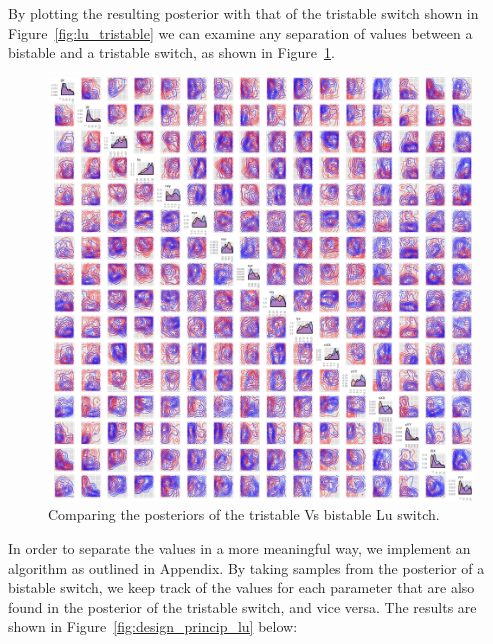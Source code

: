 By plotting the resulting posterior with that of the tristable switch shown in Figure~\ref{fig:lu_tristable} we can examine any separation of values between a bistable and a tristable switch, as shown in Figure~\ref{fig:pos_comp_lu}.

\begin{figure}[h]
\centering
\includegraphics[scale=0.4]{chapterModelling/Lu_switches/images/double_pos/posterior_comparison_bi_tri.png}
\caption{Comparing the posteriors of the tristable Vs bistable Lu switch.}
\label{fig:pos_comp_lu}
\end{figure}
\clearpage

In order to separate the values in a more meaningful way, we implement an algorithm as outlined in Appendix. By taking samples from the posterior of a bistable switch, we keep track of the values for each parameter that are also found in the posterior of the tristable switch, and vice versa. The results are shown in Figure~\ref{fig:design_princip_lu} below:


